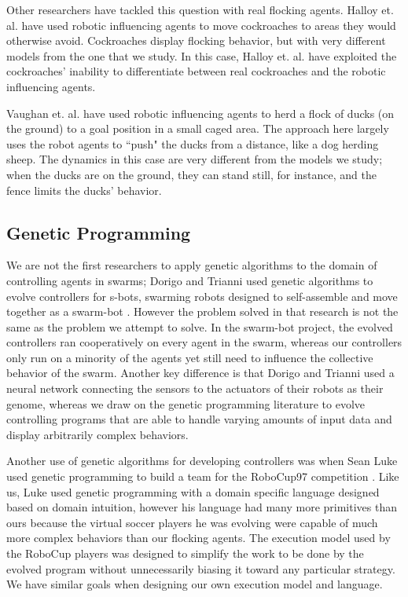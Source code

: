 Other researchers have tackled this question with real flocking agents.
Halloy et. al. \cite{Halloy2007} have used robotic influencing agents to move
cockroaches to areas they would otherwise avoid.
Cockroaches display flocking behavior, but with very different models from the
one that we study.
In this case, Halloy et. al. have exploited the cockroaches' inability to
differentiate between real cockroaches and the robotic influencing agents.

Vaughan et. al. \cite{vaughan98} have used robotic influencing agents to herd
a flock of ducks (on the ground) to a goal position in a small caged area.
The approach here largely uses the robot agents to ``push" the ducks from a
distance, like a dog herding sheep.
The dynamics in this case are very different from the models we study; when the
ducks are on the ground, they can stand still, for instance, and the fence
limits the ducks' behavior.

\subsection{Genetic Programming}
\label{sec:relatedgenetic}
We are not the first researchers to apply genetic algorithms to the domain of
controlling agents in swarms; Dorigo and Trianni used genetic algorithms to
evolve controllers for s-bots, swarming robots designed to self-assemble and
move together as a swarm-bot \cite{DorigoSwarmBot}.
However the problem solved in that research is not the same as the problem we
attempt to solve.
In the swarm-bot project, the evolved controllers ran cooperatively on every
agent in the swarm, whereas our controllers only run on a minority of the
agents yet still need to influence the collective behavior of the swarm.
Another key difference is that Dorigo and Trianni used a neural network
connecting the sensors to the actuators of their robots as their genome,
whereas we draw on the genetic programming literature to evolve controlling
programs that are able to handle varying amounts of input data and display
arbitrarily complex behaviors.

Another use of genetic algorithms for developing controllers was when Sean Luke
used genetic programming to build a team for the RoboCup97 competition
\cite{lukeRoboCup97}.
Like us, Luke used genetic programming with a domain specific language designed
based on domain intuition, however his language had many more primitives than
ours because the virtual soccer players he was evolving were capable of much
more complex behaviors than our flocking agents.
The execution model used by the RoboCup players was designed to simplify the
work to be done by the evolved program without unnecessarily biasing it toward
any particular strategy.
We have similar goals when designing our own execution model and language.

